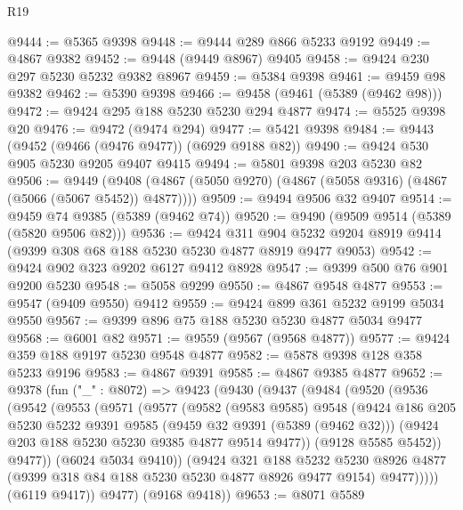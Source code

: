 \begin{lexlean}{R19}
\begin{coremodule}
@9444 := @5365 @9398
@9448 := @9444 @289 @866 @5233 @9192
@9449 := @4867 @9382
@9452 := @9448 (@9449 @8967) @9405
@9458 := @9424 @230 @297 @5230 @5232 @9382 @8967
@9459 := @5384 @9398
@9461 := @9459 @98 @9382
@9462 := @5390 @9398
@9466 := @9458 (@9461 (@5389 (@9462 @98)))
@9472 := @9424 @295 @188 @5230 @5230 @294 @4877
@9474 := @5525 @9398 @20
@9476 := @9472 (@9474 @294)
@9477 := @5421 @9398
@9484 := @9443 (@9452 (@9466 (@9476 @9477)) (@6929 @9188 @82))
@9490 := @9424 @530 @905 @5230 @9205 @9407 @9415
@9494 := @5801 @9398 @203 @5230 @82
@9506 := @9449
    (@9408 (@4867 (@5050 @9270) (@4867 (@5058 @9316) (@4867 (@5066 (@5067 @5452)) @4877))))
@9509 := @9494 @9506 @32 @9407
@9514 := @9459 @74 @9385 (@5389 (@9462 @74))
@9520 := @9490 (@9509 @9514 (@5389 (@5820 @9506 @82)))
@9536 := @9424
    @311
    @904
    @5232
    @9204
    @8919
    @9414
    (@9399 @308 @68 @188 @5230 @5230 @4877 @8919 @9477 @9053)
@9542 := @9424 @902 @323 @9202 @6127 @9412 @8928
@9547 := @9399 @500 @76 @901 @9200 @5230
@9548 := @5058 @9299
@9550 := @4867 @9548 @4877
@9553 := @9547 (@9409 @9550) @9412
@9559 := @9424 @899 @361 @5232 @9199 @5034 @9550
@9567 := @9399 @896 @75 @188 @5230 @5230 @4877 @5034 @9477
@9568 := @6001 @82
@9571 := @9559 (@9567 (@9568 @4877))
@9577 := @9424 @359 @188 @9197 @5230 @9548 @4877
@9582 := @5878 @9398 @128 @358 @5233 @9196
@9583 := @4867 @9391
@9585 := @4867 @9385 @4877
@9652 := @9378
    (fun ("_" : @8072) =>
    @9423
      (@9430
        (@9437
          (@9484
            (@9520
              (@9536
                (@9542
                  (@9553
                    (@9571
                      (@9577
                        (@9582
                          (@9583 @9585)
                          @9548
                          (@9424
                            @186
                            @205
                            @5230
                            @5232
                            @9391
                            @9585
                            (@9459 @32 @9391 (@5389 (@9462 @32)))
                            (@9424 @203 @188 @5230 @5230 @9385 @4877 @9514 @9477))
                          (@9128 @5585 @5452))
                        @9477))
                    (@6024 @5034 @9410))
                  (@9424
                    @321
                    @188
                    @5232
                    @5230
                    @8926
                    @4877
                    (@9399 @318 @84 @188 @5230 @5230 @4877 @8926 @9477 @9154)
                    @9477)))))
          (@6119 @9417))
        @9477)
      (@9168 @9418))
@9653 := @8071 @5589

\end{coremodule}
\end{lexlean}
